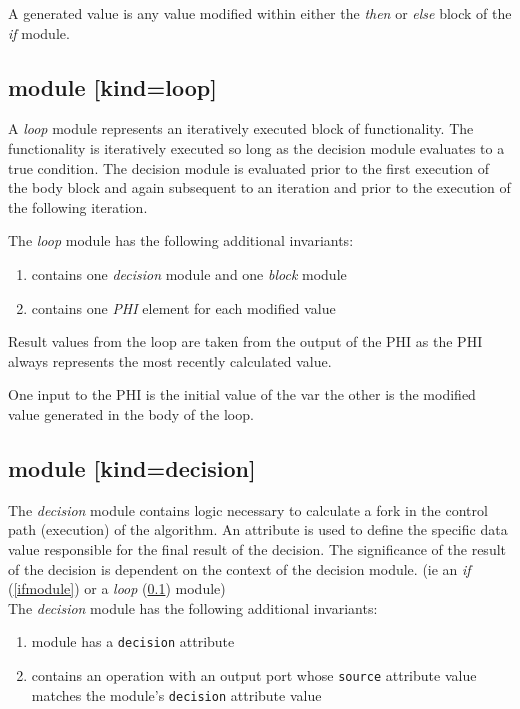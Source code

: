 A generated value is any value modified within either the {\it then} or {\it else} block of the {\it if} module.

\subsection{module [kind=loop]}\label{loopmodule}
A {\it loop} module represents an iteratively executed block of functionality.  The functionality
is iteratively executed so long as the decision module evaluates to a true condition.  The decision
module is evaluated prior to the first execution of the body block and again subsequent to an
iteration and prior to the execution of the following iteration.

The {\it loop} module has the following additional invariants:\\
\begin{enumerate}
\item contains one {\it decision} module and one {\it block} module
\item contains one {\it PHI} element for each modified value
\end{enumerate}

Result values from the loop are taken from the output of the PHI as the PHI always represents the most recently calculated value.

One input to the PHI is the initial value of the var the other is the modified value generated in the body of the loop.

\subsection{module [kind=decision]}
The {\it decision} module contains logic necessary to calculate a fork in the control path (execution) of the algorithm.  An attribute is used to define the specific data value responsible for the final result of the decision.  The significance of the result of the decision is dependent on the context of the decision module.  (ie an {\it if} (\ref{ifmodule}) or a {\it loop} (\ref{loopmodule}) module)\\
The {\it decision} module has the following additional invariants:\\
\begin{enumerate}
\item module has a {\tt decision} attribute
\item contains an operation with an output port whose {\tt source} attribute value matches the module's {\tt decision} attribute value
\end{enumerate}


